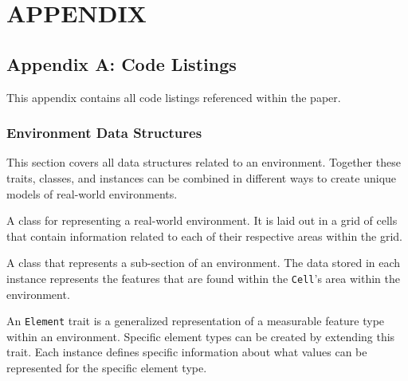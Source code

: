

\lstset{
  language=Scala, %
  basicstyle=\ttfamily,
  numbers=left,
  numberstyle=\footnotesize,
  stepnumber=1,
  numbersep=2.0mm,
  breaklines=true}


\chapter{APPENDIX} \label{appendix}

\section{Appendix A: Code Listings} \label{code_listings}
This appendix contains all code listings referenced within the paper.



\subsection{Environment Data Structures} \label{appendix:environment_data_structures}
This section covers all data structures related to an environment.
Together these traits, classes, and instances can be combined in different ways to create unique models of real-world environments.

\begin{appx}
  \caption{A class for representing a real-world environment. It is laid out in a grid of cells that contain information related to each of their respective areas within the grid.}
   \label{appendix:environment_class}
\end{appx}


\begin{appx}
  \caption{A class that represents a sub-section of an environment. The data stored in each instance represents the features that are found within the \texttt{Cell}'s area within the environment.}
   \label{appendix:cell_class}
\end{appx}


\begin{appx}
  \caption{An \texttt{Element} trait is a generalized representation of a measurable feature type within an environment. Specific element types can be created by extending this trait. Each instance defines specific information about what values can be represented for the specific element type.}
   \label{appendix:elelment_trait}
\end{appx}


